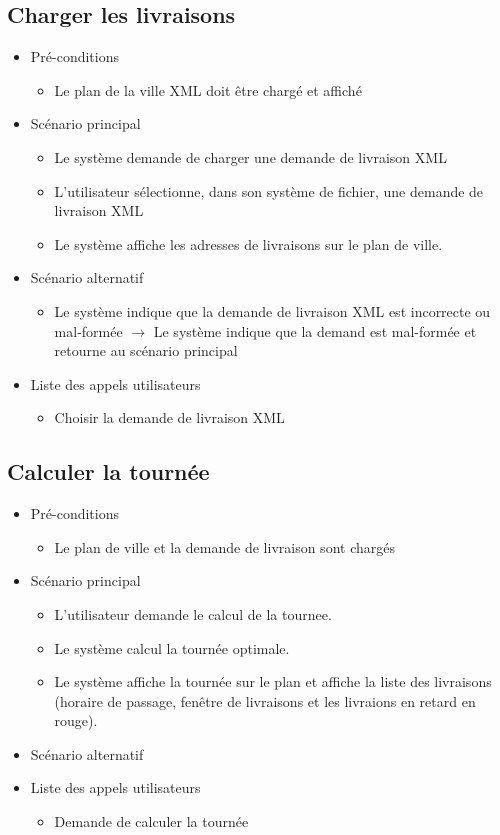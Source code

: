 \documentclass[10pt,a4paper]{book}
\begin{document}
\subsection{Charger les livraisons}
\begin{itemize}
	\item{Pré-conditions}
	\begin{itemize}
		\item{Le plan de la ville XML doit être chargé et affiché}
	\end{itemize}
	\item{Scénario principal}
	\begin{itemize}
		\item{Le système demande de charger une demande de livraison XML}
		\item{L’utilisateur sélectionne, dans son système de fichier, une demande de livraison XML}
		\item{Le système affiche les adresses de livraisons sur le plan de ville.}
	\end{itemize}
	\item{Scénario alternatif}
	\begin{itemize}
		\item{Le système indique que la demande de livraison XML est incorrecte ou mal-formée $\rightarrow$ Le système indique que la demand est mal-formée et retourne au scénario principal}
	\end{itemize}
	\item{Liste des appels utilisateurs}
	\begin{itemize}
		\item{Choisir la demande de livraison XML}
	\end{itemize}
\end{itemize}
\subsection{Calculer la tournée}
\begin{itemize}
	\item{Pré-conditions}
	\begin{itemize}
		\item{Le plan de ville et la demande de livraison sont chargés}
	\end{itemize}
	\item{Scénario principal}
	\begin{itemize}
		\item{L’utilisateur demande le calcul de la tournee.}
		\item{Le système calcul la tournée optimale.}
		\item{Le système affiche la tournée sur le plan et affiche la liste des livraisons (horaire de passage, fenêtre de livraisons et les livraions en retard en rouge).}
	\end{itemize}
	\item{Scénario alternatif}
	\item{Liste des appels utilisateurs}
	\begin{itemize}
		\item{Demande de calculer la tournée}
	\end{itemize}
\end{itemize}
\end{document}
